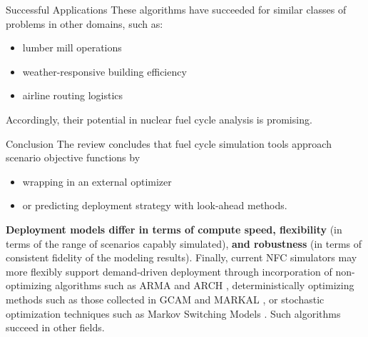 \documentclass[final]{beamer}
\newlength{\onecolwid}
\newlength{\threecolwid}
\begin{document}
\begin{frame}[t]
\begin{columns}[t,totalwidth=\threecolwid]
\begin{column}{\onecolwid}
\begin{block}{Successful Applications}
These algorithms have succeeded for similar classes of problems in other domains, such as:
\begin{itemize}
		\item lumber mill operations \cite{yanez_agent-based_2009}
		\item weather-responsive building efficiency \cite{gonzalez_detailed_2002, kusiak_data-driven_2010}
		\item airline routing logistics \cite{shebalov_practical_2009}
	\end{itemize}
Accordingly, their potential in nuclear fuel cycle analysis is promising.
\end{block}


\begin{block}{Conclusion}
The review concludes that fuel cycle simulation tools approach scenario objective 
functions by
\begin{itemize}
	\item wrapping in an external optimizer
	\item or predicting deployment strategy with look-ahead methods.
\end{itemize} 
 \textbf{Deployment models differ in terms of compute
speed, flexibility} (in terms of the range of scenarios capably
simulated), \textbf{and robustness} (in terms of consistent fidelity of the modeling results).
Finally, current NFC simulators may more flexibly support demand-driven deployment
through incorporation of non-optimizing algorithms such as ARMA \cite{woodard_stationarity_2011} and ARCH \cite{li_kernel_2016},
deterministically optimizing methods such as those collected in GCAM \cite{edmonds_advanced_1994} and
MARKAL \cite{fishbone_markal_1981}, or stochastic optimization techniques such as Markov Switching Models \cite{ansari_predicting_2015}. Such algorithms succeed in other fields.
\end{block}




\end{column}
\end{columns}
\end{frame}
\end{document}
